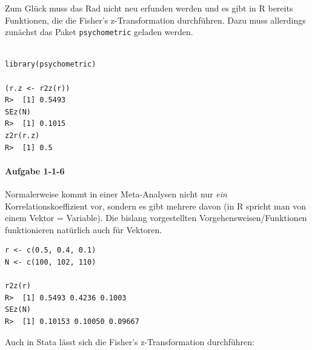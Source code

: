\documentclass[normalheadings, 10pt]{scrartcl}\usepackage{graphicx, color}
\makeatletter
\newenvironment{kframe}{%
 \def\at@end@of@kframe{}%
 \ifinner\ifhmode%
  \def\at@end@of@kframe{\end{minipage}}%
  \begin{minipage}{\columnwidth}%
 \fi\fi%
 \def\FrameCommand##1{\hskip\@totalleftmargin \hskip-\fboxsep
 \colorbox{shadecolor}{##1}\hskip-\fboxsep
     \hskip-\linewidth \hskip-\@totalleftmargin \hskip\columnwidth}%
 \MakeFramed {\advance\hsize-\width
   \@totalleftmargin\z@ \linewidth\hsize
   \@setminipage}}%
 {\par\unskip\endMakeFramed%
 \at@end@of@kframe}
\newenvironment{knitrout}{}{} %
\makeatother
\begin{document}



Zum Glück muss das Rad nicht neu erfunden werden und es gibt in R bereits
Funktionen, die die Fisher's z-Transformation durchführen. Dazu muss allerdings
zunächst das Paket \texttt{psychometric} geladen werden.

\begin{rbsp}
\begin{knitrout}
\color{fgcolor}\begin{kframe}
\begin{verbatim}

library(psychometric)

(r.z <- r2z(r))
R>  [1] 0.5493
SEz(N)
R>  [1] 0.1015
z2r(r.z)
R>  [1] 0.5
\end{verbatim}
\end{kframe}
\end{knitrout}

\end{rbsp}


\paragraph{Aufgabe 1-1-6} Normalerweise kommt in einer Meta-Analysen nicht nur
\emph{ein} Korrelationskoeffizient vor, sondern es gibt mehrere davon (in R spricht man
von einem Vektor = Variable). Die bislang vorgestellten
Vorgehensweisen/Funktionen funktionieren natürlich auch für Vektoren.

\begin{rbsp}
\begin{knitrout}
\color{fgcolor}\begin{kframe}
\begin{verbatim}
r <- c(0.5, 0.4, 0.1)
N <- c(100, 102, 110)

r2z(r)
R>  [1] 0.5493 0.4236 0.1003
SEz(N)
R>  [1] 0.10153 0.10050 0.09667
\end{verbatim}
\end{kframe}
\end{knitrout}

\end{rbsp}


Auch in Stata lässt sich die Fisher's z-Transformation durchführen:


\begin{statabsp}
  
\end{statabsp}
\end{document}
